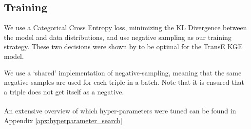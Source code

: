 \subsection{Training}
We use a Categorical Cross Entropy loss, minimizing the KL Divergence between the model and data distributions, and use negative sampling as our training strategy. These two decisions were shown by \citeauthor{ruffinelli_you_2019} to be optimal for the TransE KGE model. 

We use a `shared' implementation of negative-sampling, meaning that the same negative samples are used for each triple in a batch. Note that it is ensured that a triple does not get itself as a negative.

\paragraph{}\noindent%
An extensive overview of which hyper-parameters were tuned can be found in Appendix \ref{apx:hyperparameter_search}

